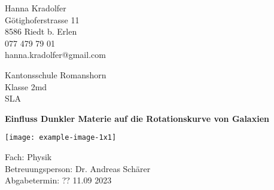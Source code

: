 
\begin{titlepage}
	\clearpage\thispagestyle{empty}	
	
	\begin{minipage}[t]{\textwidth}
		\begin{minipage}[t]{0.5\textwidth}
			Hanna Kradolfer\\
			Götighoferstrasse 11\\
			8586 Riedt b. Erlen\\
			077 479 79 01\\
			hanna.kradolfer@gmail.com
		\end{minipage}
		\begin{minipage}[t]{0.5\textwidth}
			\begin{flushright}
				Kantonsschule Romanshorn\\
				Klasse 2md\\
				SLA
			\end{flushright}
		\end{minipage}
	\end{minipage}
	
	\vspace{4cm}
	
	{
		\centering
		\Huge\bfseries Einfluss Dunkler Materie auf die Rotationskurve von Galaxien \par
		\vspace{1cm}
		\texttt{[image: example-image-1x1]}\par
	}
	
	\vspace{9cm}	
	\noindent
	Fach: Physik \noindent\\
	Betreuungsperson: Dr. Andreas Schärer\\
	Abgabetermin: ?? 11.09 2023
	
\end{titlepage}
